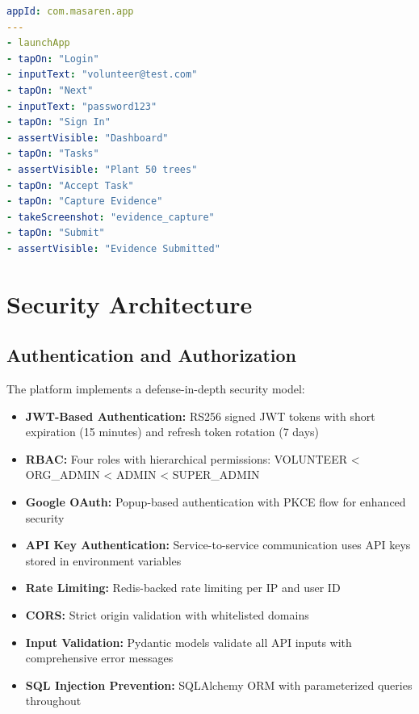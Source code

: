 \documentclass[11pt,a4paper]{article}
\begin{document}
\begin{lstlisting}[language=yaml, caption=Mobile E2E Flow]
appId: com.masaren.app
---
- launchApp
- tapOn: "Login"
- inputText: "volunteer@test.com"
- tapOn: "Next"
- inputText: "password123"
- tapOn: "Sign In"
- assertVisible: "Dashboard"
- tapOn: "Tasks"
- assertVisible: "Plant 50 trees"
- tapOn: "Accept Task"
- tapOn: "Capture Evidence"
- takeScreenshot: "evidence_capture"
- tapOn: "Submit"
- assertVisible: "Evidence Submitted"
\end{lstlisting}

\clearpage

\section{Security Architecture}

\subsection{Authentication and Authorization}

The platform implements a defense-in-depth security model:

\begin{itemize}
  \item \textbf{JWT-Based Authentication:} RS256 signed JWT tokens with short expiration (15 minutes) and refresh token rotation (7 days)
  \item \textbf{RBAC:} Four roles with hierarchical permissions: VOLUNTEER < ORG\_ADMIN < ADMIN < SUPER\_ADMIN
  \item \textbf{Google OAuth:} Popup-based authentication with PKCE flow for enhanced security
  \item \textbf{API Key Authentication:} Service-to-service communication uses API keys stored in environment variables
  \item \textbf{Rate Limiting:} Redis-backed rate limiting per IP and user ID
  \item \textbf{CORS:} Strict origin validation with whitelisted domains
  \item \textbf{Input Validation:} Pydantic models validate all API inputs with comprehensive error messages
  \item \textbf{SQL Injection Prevention:} SQLAlchemy ORM with parameterized queries throughout
\end{itemize}
\end{document}
